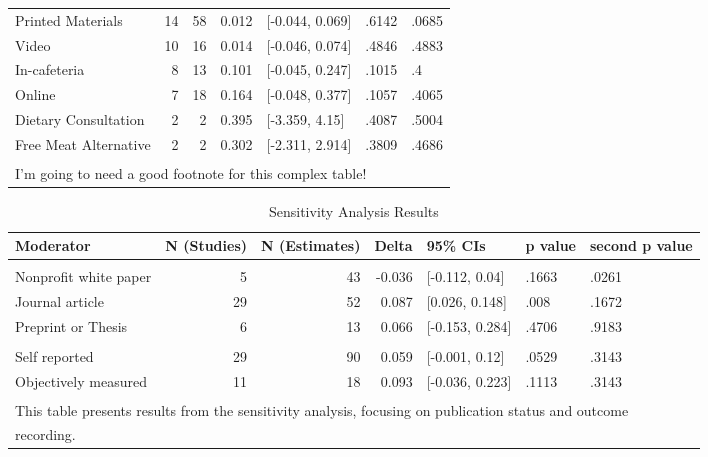 \documentclass[sn-nature,referee,pdflatex]{sn-jnl}
\begin{document}
\begin{table}
\begin{tabular}[t]{lrrrlll}
\hspace{1em}Printed Materials & 14 & 58 & 0.012 & {}[-0.044, 0.069] & .6142 & .0685\\
\hspace{1em}Video & 10 & 16 & 0.014 & {}[-0.046, 0.074] & .4846 & .4883\\
\hspace{1em}In-cafeteria & 8 & 13 & 0.101 & {}[-0.045, 0.247] & .1015 & .4\\
\hspace{1em}Online & 7 & 18 & 0.164 & {}[-0.048, 0.377] & .1057 & .4065\\
\hspace{1em}Dietary Consultation & 2 & 2 & 0.395 & {}[-3.359, 4.15] & .4087 & .5004\\
\hspace{1em}Free Meat Alternative & 2 & 2 & 0.302 & {}[-2.311, 2.914] & .3809 & .4686\\
\bottomrule
\multicolumn{7}{l}{\textsuperscript{} I'm going to need a good footnote for this complex table!}\\
\end{tabular}
\end{table}

\begin{table}

\caption{\label{tab:table_three}Sensitivity Analysis Results}
\centering
\begin{tabular}[t]{lrrrlll}
\toprule
Moderator & N (Studies) & N (Estimates) & Delta & 95\% CIs & p value & second p value\\
\midrule
\addlinespace[0.5em]
\multicolumn{7}{l}{\textbf{Publication Status}}\\
\hspace{1em}Nonprofit white paper & 5 & 43 & -0.036 & {}[-0.112, 0.04] & .1663 & .0261\\
\hspace{1em}Journal article & 29 & 52 & 0.087 & {}[0.026, 0.148] & .008 & .1672\\
\hspace{1em}Preprint or Thesis & 6 & 13 & 0.066 & {}[-0.153, 0.284] & .4706 & .9183\\
\addlinespace[0.5em]
\multicolumn{7}{l}{\textbf{Outcome Recording}}\\
\hspace{1em}Self reported & 29 & 90 & 0.059 & {}[-0.001, 0.12] & .0529 & .3143\\
\hspace{1em}Objectively measured & 11 & 18 & 0.093 & {}[-0.036, 0.223] & .1113 & .3143\\
\bottomrule
\multicolumn{7}{l}{\textsuperscript{} This table presents results from the sensitivity analysis, focusing on publication status and outcome}\\
\multicolumn{7}{l}{recording.}\\
\end{tabular}
\end{table}
\end{document}
